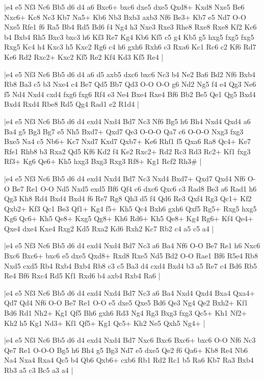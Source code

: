 \whitename{}
\blackname{}
\makegametitle
|e4 e5 Nf3 Nc6 Bb5 d6 d4 a6 Bxc6+ bxc6 dxe5 dxe5 Qxd8+ Kxd8 Nxe5 Be6 Nxc6+ Kc8 Nc3 Kb7 Na5+ Kb6 Nb3 Bxb3 axb3 Nf6 Be3+ Kb7 e5 Nd7 O-O Nxe5 Rfe1 f6 Ra5 Bb4 Rd5 Bd6 f4 Ng4 h3 Nxe3 Rxe3 Rhe8 Rxe8 Rxe8 Kf2 Kc6 b4 Bxb4 Rh5 Bxc3 bxc3 h6 Kf3 Re7 Kg4 Kb6 Kf5 c5 g4 Kb5 g5 hxg5 fxg5 fxg5 Rxg5 Kc4 h4 Kxc3 h5 Kxc2 Rg6 c4 h6 gxh6 Rxh6 c3 Rxa6 Kc1 Rc6 c2 Kf6 Rd7 Ke6 Rd2 Rxc2+ Kxc2 Kf5 Re2 Kf4 Kd3 Kf5 Re4  |

\whitename{}
\blackname{}
\makegametitle
|e4 e5 Nf3 Nc6 Bb5 d6 d4 a6 d5 axb5 dxc6 bxc6 Nc3 b4 Ne2 Ba6 Bd2 Nf6 Bxb4 Rb8 Ba3 c5 b3 Nxe4 c4 Be7 Qd5 Bb7 Qd3 O-O O-O g6 Nd2 Ng5 f4 e4 Qg3 Ne6 f5 Nd4 Nxd4 cxd4 fxg6 fxg6 Rf4 e3 Ne4 Bxe4 Rxe4 Bf6 Bb2 Be5 Qe1 Qg5 Bxd4 Bxd4 Rxd4 Rbe8 Rd5 Qg4 Rad1 e2 R1d4  |

\whitename{}
\blackname{}
\makegametitle
|e4 e5 Nf3 Nc6 Bb5 d6 d4 exd4 Nxd4 Bd7 Nc3 Nf6 Bg5 h6 Bh4 Nxd4 Qxd4 a6 Ba4 g5 Bg3 Bg7 e5 Nh5 Bxd7+ Qxd7 Qe3 O-O-O Qa7 c6 O-O-O Nxg3 fxg3 Bxe5 Na4 c5 Nb6+ Kc7 Nxd7 Kxd7 Qxb7+ Ke6 Rhf1 f5 Qxa6 Ra8 Qc4+ Ke7 Rfe1 Rhb8 b3 Rxa2 Qd5 Kf6 Kd2 f4 Ke2 Rxc2+ Rd2 Rc3 Rd3 Rc2+ Kf1 fxg3 Rf3+ Kg6 Qe6+ Kh5 hxg3 Bxg3 Rxg3 Rf8+ Kg1 Rcf2 Rh3\#  |

\whitename{}
\blackname{}
\makegametitle
|e4 e5 Nf3 Nc6 Bb5 d6 d4 exd4 Nxd4 Bd7 Nc3 Nxd4 Bxd7+ Qxd7 Qxd4 Nf6 O-O Be7 Re1 O-O Nd5 Nxd5 exd5 Bf6 Qf4 c6 dxc6 Qxc6 c3 Rad8 Be3 a6 Rad1 h6 Qg3 Kh8 Rd4 Bxd4 Bxd4 f6 Re7 Rg8 Qh3 d5 f4 Qd6 Re3 Qxf4 Rg3 Qc1+ Kf2 Qxb2+ Kf3 Qc1 Be3 Qf1+ Kg4 f5+ Kh5 Qc4 Bxh6 gxh6 Qxf5 Rg5+ Rxg5 hxg5 Kg6 Qc6+ Kh5 Qe8+ Kxg5 Qg8+ Kh6 Rd6+ Kh5 Qe8+ Kg4 Rg6+ Kf4 Qe4+ Qxe4 dxe4 Kxe4 Rxg2 Kd5 Rxa2 Kd6 Rxh2 Kc7 Rb2 c4 a5 c5 a4  |

\whitename{}
\blackname{}
\makegametitle
|e4 e5 Nf3 Nc6 Bb5 d6 d4 exd4 Nxd4 Bd7 Nc3 a6 Ba4 Nf6 O-O Be7 Re1 h6 Nxc6 Bxc6 Bxc6+ bxc6 e5 dxe5 Qxd8+ Rxd8 Rxe5 Nd5 Bd2 O-O Rae1 Bf6 R5e4 Rb8 Nxd5 cxd5 Rb4 Rxb4 Bxb4 Rb8 c3 c5 Ba3 d4 cxd4 Bxd4 b3 a5 Re7 c4 Bd6 Rb5 Re4 Bf6 Rxc4 Rd5 Kf1 Rxd6 b4 axb4 Rxb4 Ra6  |

\whitename{}
\blackname{}
\makegametitle
|e4 e5 Nf3 Nc6 Bb5 d6 d4 exd4 Nxd4 Bd7 Nc3 a6 Ba4 Nxd4 Qxd4 Bxa4 Qxa4+ Qd7 Qd4 Nf6 O-O Be7 Re1 O-O e5 dxe5 Qxe5 Bd6 Qe3 Ng4 Qe2 Bxh2+ Kf1 Bd6 Rd1 Nh2+ Kg1 Qf5 Bh6 gxh6 Rd3 Ng4 Rg3 Bxg3 fxg3 Qc5+ Kh1 Nf2+ Kh2 h5 Kg1 Nd3+ Kf1 Qf5+ Kg1 Qc5+ Kh2 Ne5 Qxh5 Ng4+  |

\whitename{}
\blackname{}
\makegametitle
|e4 e5 Nf3 Nc6 Bb5 d6 d4 exd4 Nxd4 Bd7 Nxc6 Bxc6 Bxc6+ bxc6 O-O Nf6 Nc3 Qe7 Re1 O-O-O Bg5 h6 Bh4 g5 Bg3 Nd7 e5 dxe5 Qe2 f6 Qa6+ Kb8 Re4 Nb6 Na4 Nxa4 Rxa4 Qc5 b4 Qb6 Qxb6+ cxb6 Rb1 Rd2 Rc1 b5 Ra6 Kb7 Ra3 Bxb4 Rb3 a5 c3 Bc5 a3 a4  |

